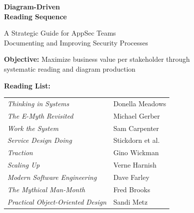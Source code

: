 \documentclass[11pt,letterpaper]{article}
\newcommand{\booktitle}[1]{\textit{#1}}
\begin{document}
\begin{titlepage}
    \centering
    \vspace*{1.5cm}

    {\Huge\bfseries\color{primaryblue} Diagram-Driven\\[0.3cm] Reading Sequence\par}

    \vspace{0.8cm}

    {\Large\color{accentblue} A Strategic Guide for AppSec Teams\\[0.2cm]
    Documenting and Improving Security Processes\par}

    \vspace{1.5cm}

    \begin{tcolorbox}[
        colback=lightgray,
        colframe=primaryblue,
        width=0.9\textwidth,
        arc=5pt,
        boxrule=1.5pt
    ]
    \centering
    \large
    \textbf{Objective:} Maximize business value per stakeholder through\\
    systematic reading and diagram production

    \vspace{0.5cm}

    \textbf{Reading List:}\\[0.3cm]
    \begin{tabular}{ll}
    \booktitle{Thinking in Systems} & Donella Meadows \\
    \booktitle{The E-Myth Revisited} & Michael Gerber \\
    \booktitle{Work the System} & Sam Carpenter \\
    \booktitle{Service Design Doing} & Stickdorn et al. \\
    \booktitle{Traction} & Gino Wickman \\
    \booktitle{Scaling Up} & Verne Harnish \\
    \booktitle{Modern Software Engineering} & Dave Farley \\
    \booktitle{The Mythical Man-Month} & Fred Brooks \\
    \booktitle{Practical Object-Oriented Design} & Sandi Metz \\
    \end{tabular}
    \end{tcolorbox}


\end{titlepage}
\end{document}
